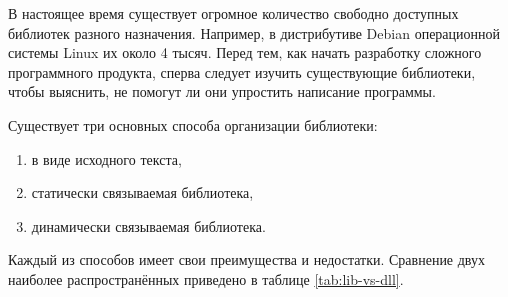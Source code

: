 В настоящее время существует огромное количество свободно доступных
библиотек разного назначения. Например, в дистрибутиве Debian
операционной системы Linux их около 4 тысяч. Перед тем, как начать
разработку сложного программного продукта, сперва следует изучить
существующие библиотеки, чтобы выяснить, не помогут ли они упростить
написание программы.


Существует три основных способа организации библиотеки:
\begin{enumerate}
\item в виде исходного текста,
\item статически связываемая библиотека,
\item динамически связываемая библиотека.
\end{enumerate}

Каждый из способов имеет свои преимущества и недостатки. Сравнение
двух наиболее распространённых приведено в таблице \ref{tab:lib-vs-dll}.

